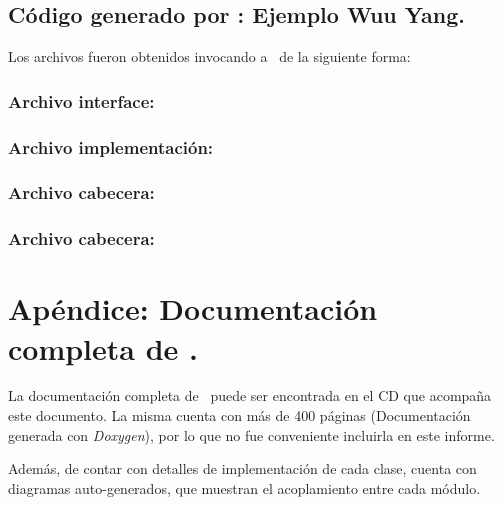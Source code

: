 \section{Código generado por \maggen: Ejemplo Wuu Yang.}
\label{append:agwuuyangcode}

Los archivos fueron obtenidos invocando a \maggen\ de la siguiente forma:

\begin{center}
\footnotesize
{}
\end{center}

\subsection{Archivo interface: }
\label{append:maggenhpp}


\subsection{Archivo implementación: }
\label{append:maggencpp}


\subsection{Archivo cabecera: }
\label{append:nodehpp}


\subsection{Archivo cabecera: }
\label{append:planhpp}


\normalsize
\chapter{Apéndice: Documentación completa de \maggen.}
\label{chap:appendix-b}
La documentación completa de \maggen\ puede ser encontrada en el CD que acompaña este documento. La misma cuenta con más de 400 páginas (Documentación generada con \textit{Doxygen}), por lo que no fue conveniente incluirla en este informe. 

Además, de contar con detalles de implementación de cada clase, cuenta con diagramas auto-generados, que muestran el acoplamiento entre cada módulo.


